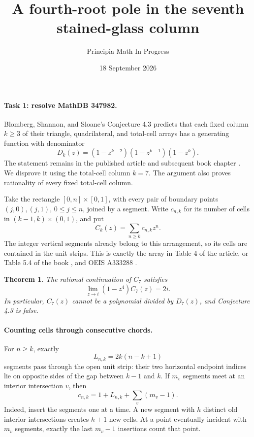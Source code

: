 \documentclass[11pt]{article}
\title{A fourth-root pole in the seventh stained-glass column}
\author{Principia Math In Progress}
\date{18 September 2026}
\newtheorem{theorem}{Theorem}
\begin{document}
\maketitle

\paragraph{Task 1: resolve MathDB 347982.}
Blomberg, Shannon, and Sloane's Conjecture 4.3 predicts that each fixed
column \(k\ge3\) of their triangle, quadrilateral, and total-cell arrays
has a generating function with denominator
\[
 D_k(z)=(1-z^{k-2})(1-z^{k-1})(1-z^k).
\]
The statement remains in the published article and subsequent book
chapter \cite{BSS}. We disprove it using the total-cell column \(k=7\).
The argument also proves rationality of every fixed total-cell column.

Take the rectangle \([0,n]\times[0,1]\), with every pair of boundary
points \((j,0),(j,1)\), \(0\le j\le n\), joined by a segment. Write
\(c_{n,k}\) for its number of cells in
\((k-1,k)\times(0,1)\), and put
\[
 C_k(z)=\sum_{n\ge k}c_{n,k}z^n .
\]
The integer vertical segments already belong to this arrangement, so
its cells are contained in the unit strips. This is exactly the array
in Table 4 of the article, or Table 5.4 of the book \cite{BSS}, and
OEIS A333288 \cite{OEIS}.

\begin{theorem}
The rational continuation of \(C_7\) satisfies
\[
 \lim_{z\to i}(1-z^4)C_7(z)=2i .
\]
In particular, \(C_7(z)\) cannot be a polynomial divided by \(D_7(z)\),
and Conjecture 4.3 is false.
\end{theorem}

\paragraph{Counting cells through consecutive chords.}
For \(n\ge k\), exactly
\[
 L_{n,k}=2k(n-k+1)
\]
segments pass through the open unit strip: their two horizontal endpoint
indices lie on opposite sides of the gap between \(k-1\) and \(k\).
If \(m_v\) segments meet at an interior intersection \(v\), then
\begin{equation}\label{cells}
 c_{n,k}=1+L_{n,k}+\sum_v(m_v-1).
\end{equation}
Indeed, insert the segments one at a time. A new segment with \(h\)
distinct old interior intersections creates \(h+1\) new cells.
At a point eventually incident with \(m_v\) segments, exactly the last
\(m_v-1\) insertions count that point.
\end{document}
